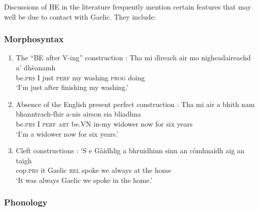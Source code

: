\documentclass[output=paper,colorlinks,citecolor=brown]{langscibook}
\begin{document}
Discussions of HE in the literature frequently mention certain features that may well be due to contact with Gaelic. They include:

\subsubsection{Morphosyntax}

\begin{enumerate}
    \item The “BE after V-ing” construction \citep{Sabban:1985}:
    \ea
    \gll Tha  mi  dìreach  air    mo  nigheadaireachd  a’  dhèanamh \\
    be.\textsc{prs}  I  just  \textsc{perf}  my  washing  \textsc{prog}  doing \\
    \glt ‘I'm just after finishing my washing.’
    \z

    \item Absence of the English present perfect construction \citep{Sabban:1985}: 
    \ea
    \gll Tha	mi	air a	bhith	nam	bhanntrach-fhir	a-nis	airson	sia	bliadhna \\
    be.\textsc{prs}  I  \textsc{perf}  \textsc{art}  be.\textsc{VN}  in-my   widower  now  for  six  years \\
    \glt ‘I’m a widower now for six years.’
    \z

    \item Cleft constructions \citep{Shuken:1984}:
    \ea
    \gll ‘S e   Gàidhlig    a   bhruidhinn  sinn    {an  còmhnaidh}   aig an  taigh \\
    cop.\textsc{prs}    it  Gaelic  \textsc{rel}    spoke   we  always  at  the home \\
    \glt ‘It was always Gaelic we spoke in the home.’
    \z
\end{enumerate}


\subsubsection{Phonology}
\end{document}

